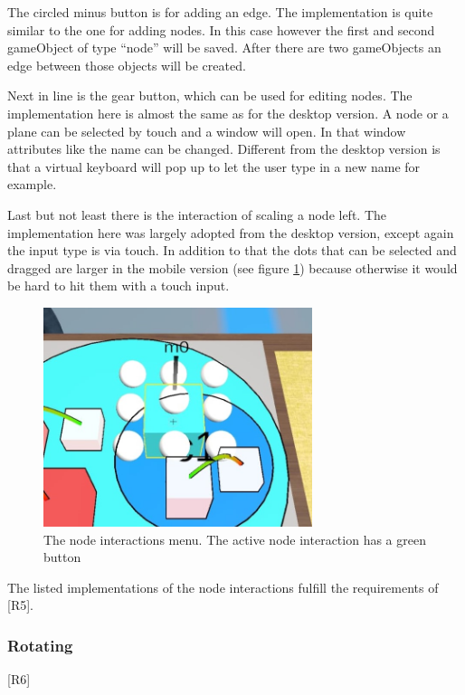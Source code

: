 The circled minus button is for adding an \gls{edge}.
The implementation is quite similar to the one for adding \glspl{node}.
In this case however the first and second \gls{gameObject} of type \enquote{\gls{node}} will be saved.
After there are two \glspl{gameObject} an \gls{edge} between those objects will be created.

Next in line is the gear button, which can be used for editing \glspl{node}.
The implementation here is almost the same as for the desktop version.
A \gls{node} or a \gls{plane} can be selected by touch and a window will open.
In that window attributes like the name can be changed.
Different from the desktop version is that a virtual keyboard will pop up to let the user type in a new name for example.

Last but not least there is the interaction of scaling a node left.
The implementation here was largely adopted from the desktop version, except again the input type is via touch.
In addition to that the dots that can be selected and dragged are larger in the mobile version (see figure \ref{fig:scale}) because otherwise it would be hard to hit them with a touch input.

\begin{figure}[htb]
    \centering
    \includegraphics[width=0.7\textwidth]{Implementation/img/scale.jpeg}
    \caption{The node interactions menu. The active node interaction has a green button}\label{fig:scale}
\end{figure}

The listed implementations of the node interactions fulfill the requirements of [R5].

\subsubsection{Rotating}
[R6]

